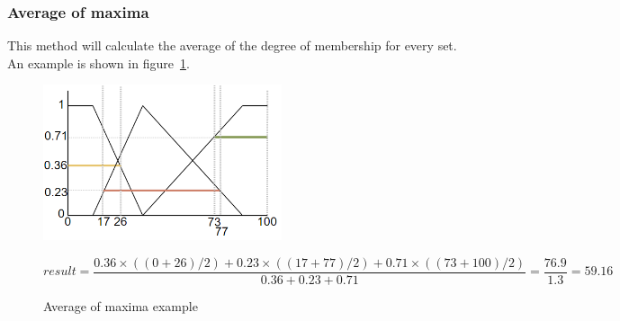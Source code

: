 \documentclass{article}
\begin{document}
   \subsubsection {Average of maxima}  
   This method will calculate the average of the degree of membership for every set. An example is shown in figure~\ref{fig:maxAv}.
   \begin{figure}[h!]
   \begin{center}
   \includegraphics[width=7cm]{maxAv.png}
   \end{center}
   \[ result = \frac{0.36 \times ((0 + 26) / 2) + 0.23 \times ((17 + 77) / 2) + 0.71 \times ((73 + 100) / 2)}{0.36 + 0.23 + 0.71} = \frac{76.9}{1.3} = {59.16}\]
   \caption{Average of maxima example}
   \label{fig:maxAv}
   \end{figure}
   
\end{document}
